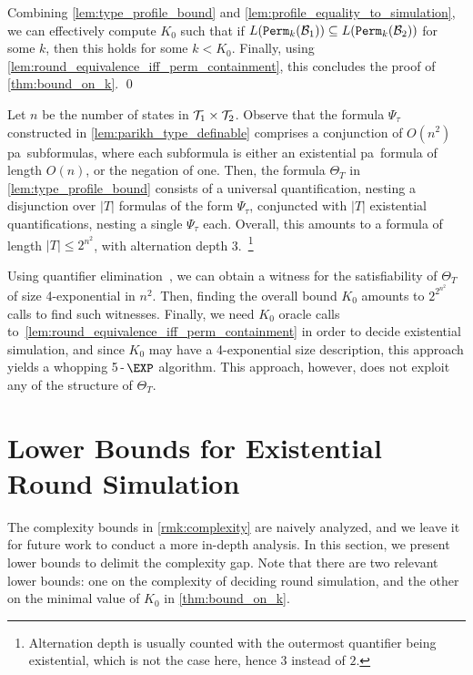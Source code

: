 Combining \autoref{lem:type_profile_bound} and \autoref{lem:profile_equality_to_simulation}, we can effectively compute $K_0$ such that if \linebreak
$L({\mathtt{Perm}}_{k}(\mathcal{B}_1)) \subseteq L({\mathtt{Perm}}_{k}(\mathcal{B}_2))$
for some $k$, then this holds for some $k<K_0$. Finally, using \autoref{lem:round_equivalence_iff_perm_containment}, this concludes the proof of \autoref{thm:bound_on_k}. \qed

\begin{remark}
\label{rmk:complexity}
Let $n$ be the number of states in $\mathcal{T}_1\times \mathcal{T}_2$. Observe that the formula $\Psi_\tau$ constructed in \autoref{lem:parikh_type_definable} comprises a conjunction of $O(n^2)$ \gls{pa}~subformulas, where each subformula is either an existential \gls{pa}~formula of length $O(n)$, or the negation of one. Then, the formula $\Theta_T$ in \autoref{lem:type_profile_bound} consists of a universal quantification, nesting a disjunction over $|T|$ formulas of the form $\Psi_\tau$, conjuncted with $|T|$ existential quantifications, nesting a single $\Psi_\tau$ each.
Overall, this amounts to a formula of length $|T|\le 2^{n^2}$, with alternation depth 3.~\footnote{Alternation depth is usually counted with the outermost quantifier being existential, which is not the case here, hence $3$ instead of $2$.}

Using quantifier elimination~\cite{Cooper1972,Oppen1978}, we can obtain a witness for the satisfiability of $\Theta_T$ of size 4-exponential in $n^2$. Then, finding the overall bound $K_0$ amounts to $2^{2^{n^2}}$ calls to find such witnesses. Finally, we need $K_0$ oracle calls to~\autoref{lem:round_equivalence_iff_perm_containment} in order to decide existential simulation, and since $K_0$ may have a 4-exponential size description, this approach yields a whopping 5\,-\,$\EXP$ algorithm. 
This approach, however, does not exploit any of the structure of $\Theta_T$.
\end{remark}

\section{Lower Bounds for Existential Round Simulation}
\label{sec:lower_bounds_existential}
The complexity bounds in \autoref{rmk:complexity} are naively analyzed, and we leave it for future work to conduct a more in-depth analysis. In this section, we present lower bounds to delimit the complexity gap. Note that there are two relevant lower bounds: one on the complexity of deciding round simulation, and the other on the minimal value of $K_0$ in \autoref{thm:bound_on_k}.

